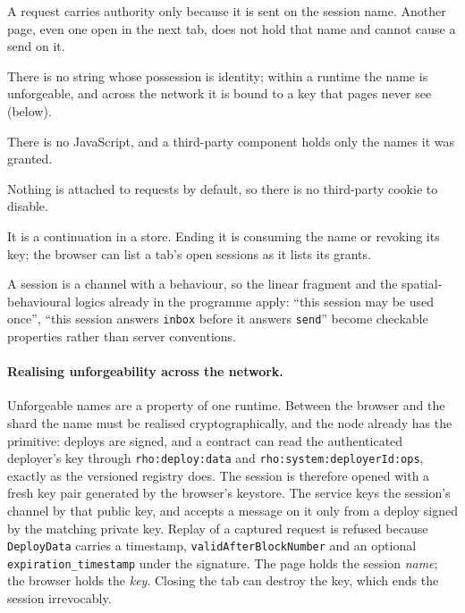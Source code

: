 \documentclass[11pt]{article}
\theoremstyle{definition}
\theoremstyle{remark}
\newcommand{\code}[1]{\texttt{#1}}
\begin{document}
\begin{description}[leftmargin=1.5em,style=nextline]
\item[No ambient authority, so no cross-site request forgery.] A request carries
  authority only because it is sent on the session name. Another page, even one open
  in the next tab, does not hold that name and cannot cause a send on it.
\item[No bearer token to steal.] There is no string whose possession is identity;
  within a runtime the name is unforgeable, and across the network it is bound to a key
  that pages never see (below).
\item[No script to exfiltrate it.] There is no JavaScript, and a third-party component
  holds only the names it was granted.
\item[No tracking side-channel.] Nothing is attached to requests by default, so there
  is no third-party cookie to disable.
\item[The session is visible and killable.] It is a continuation in a store. Ending it
  is consuming the name or revoking its key; the browser can list a tab's open
  sessions as it lists its grants.
\item[Its protocol can be typed.] A session is a channel with a behaviour, so the
  linear fragment and the spatial-behavioural logics already in the programme apply:
  ``this session may be used once'', ``this session answers \code{inbox} before it
  answers \code{send}'' become checkable properties rather than server conventions.
\end{description}

\paragraph{Realising unforgeability across the network.}
Unforgeable names are a property of one runtime. Between the browser and the shard
the name must be realised cryptographically, and the node already has the primitive:
deploys are signed, and a contract can read the authenticated deployer's key through
\code{rho:deploy:data} and \code{rho:system:deployerId:ops}, exactly as the versioned
registry does. The session is therefore opened with a fresh key pair generated by the
browser's keystore. The service keys the session's channel by that public key, and
accepts a message on it only from a deploy signed by the matching private key. Replay
of a captured request is refused because \code{DeployData} carries a timestamp,
\code{validAfterBlockNumber} and an optional \code{expiration\_timestamp} under the
signature. The page holds the session \emph{name}; the browser holds the \emph{key}.
Closing the tab can destroy the key, which ends the session irrevocably.
\end{document}
